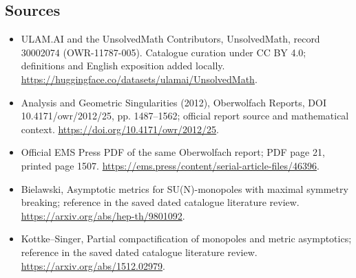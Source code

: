 \documentclass[11pt]{article}
\begin{document}
\subsection{Sources}
\begin{itemize}
\item[\hypertarget{source:30002074:1}{S1}] ULAM.AI and the UnsolvedMath Contributors, UnsolvedMath, record 30002074 (OWR-11787-005). Catalogue curation under CC BY 4.0; definitions and English exposition added locally.
\url{https://huggingface.co/datasets/ulamai/UnsolvedMath}.
\item[\hypertarget{source:30002074:2}{S2}] Analysis and Geometric Singularities (2012), Oberwolfach Reports, DOI 10.4171/owr/2012/25, pp. 1487--1562; official report source and mathematical context.
\url{https://doi.org/10.4171/owr/2012/25}.
\item[\hypertarget{source:30002074:3}{S3}] Official EMS Press PDF of the same Oberwolfach report; PDF page 21, printed page 1507.
\url{https://ems.press/content/serial-article-files/46396}.
\item[\hypertarget{source:30002074:4}{S4}] Bielawski, Asymptotic metrics for SU(N)-monopoles with maximal symmetry breaking; reference in the saved dated catalogue literature review.
\url{https://arxiv.org/abs/hep-th/9801092}.
\item[\hypertarget{source:30002074:5}{S5}] Kottke--Singer, Partial compactification of monopoles and metric asymptotics; reference in the saved dated catalogue literature review.
\url{https://arxiv.org/abs/1512.02979}.
\end{itemize}
\label{end:30002074}
\end{document}
